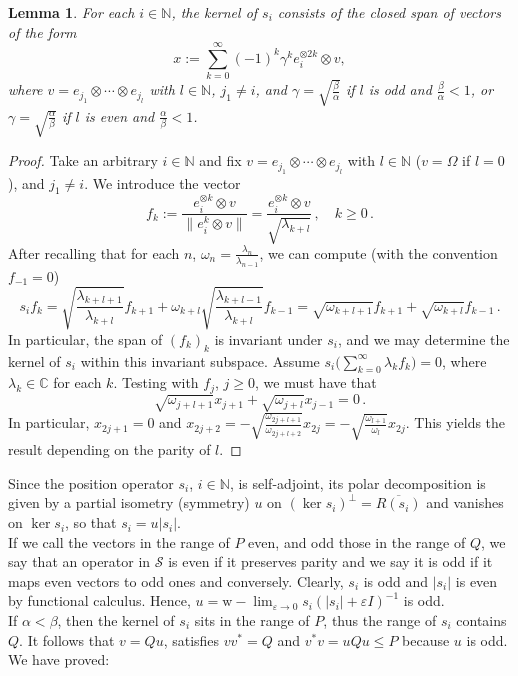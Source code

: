 \documentclass[12pt]{amsart}
\numberwithin{equation}{section}
\def\bc{{\mathbb C}}
\def\bn{{\mathbb N}}
\def\a{\alpha}
\def\b{\beta}
\def\g{\gamma}  \def\G{\Gamma}
\def\eps{\varepsilon}
\def\l{\lambda} \def\L{\Lambda}
\newtheorem{lem}[thm]{Lemma}
\theoremstyle{definition}
\begin{document}
\begin{lem}\label{kernel}
For each $i\in\bn$, the kernel of $s_i$ consists of the closed span of vectors of the form
\begin{equation*}%
x:=\sum_{k=0}^\infty {(-1)^k}{\g^{k}}e_i^{\otimes 2k}\otimes v,
\end{equation*}
where $v=e_{j_1}\otimes \cdots \otimes e_{j_l}$ with $l\in\bn$, $j_1\neq i$, and
$\g=\sqrt{\frac \b \a}$ if $l$ is odd and $\frac \b \a<1$, or $\g=\sqrt{\frac \a \b}$ if $l$ is even and $\frac \a \b<1$.
\end{lem}
\begin{proof}
Take an arbitrary $i\in\bn$ and fix
  $v=e_{j_1} \otimes \cdots \otimes e_{j_l}$ with
  $l\in\bn$ ($v=\Omega$ if $l=0$), and $j_1\neq i$. We introduce the vector
$$
f_k:=\frac{e_i^{\otimes k}\otimes v} {\| e_i^{k}\otimes v\|}= \frac{e_i^{\otimes k}\otimes
  v}{\sqrt{\lambda_{k+l}}}\,, \quad k\geq 0\,.
$$
After recalling that  for each $n$, $\omega_n= \frac {\lambda_n}{\lambda_{n-1}}$, we can compute (with
  the convention $f_{-1}=0$)
$$
s_if_k= \sqrt{\frac{\lambda_{k+l+1}}{\lambda_{k+l}}}f_{k+1}+
  \omega_{k+l} \sqrt{\frac{\lambda_{k+l-1}}{\lambda_{k+l}}}f_{k-1}=
  \sqrt{\omega_{k+l+1}} f_{k+1}+ \sqrt{\omega_{k+l}}f_{k-1}\,.
$$
In particular, the span of $(f_k)_k$ is invariant under $s_i$, and we may determine the kernel of $s_i$ within this invariant subspace. Assume $s_i\big(\sum_{k=0}^\infty \l_k f_k\big)=0$, where $\l_k\in\bc$ for each $k$. Testing with $f_j$, $j\geq 0$, we must have that
$$
\sqrt{\omega_{j+l+1}} x_{j+1}+ \sqrt{\omega_{j+l}}x_{j-1}=0\,.
$$
In particular, $x_{2j+1}=0$ and
  $x_{2j+2}=
 - \sqrt{\frac{\omega_{2j+l+1}}{\omega_{2j+l+2}}}x_{2j}=-\sqrt{\frac{\omega_{l+1}}{\omega_{l}}}
  x_{2j}$.  This yields the result depending on the parity of $l$.
\end{proof}
Since the position operator $s_i$, $i\in\bn$, is self-adjoint, its polar decomposition is given by a partial isometry (symmetry) $u$ on $(\ker s_i)^{\perp}=\overline{R(s_i)}$ and vanishes on $\ker s_i$, so that $s_i=u|s_i|$. \\
If we call the vectors in the range of $P$ even, and odd those in the range of $Q$, we say that an operator in $\mathcal S$ is even if it preserves parity and we say it is odd if it maps even vectors to odd ones and conversely. Clearly, $s_i$ is odd and $|s_i|$ is even by functional calculus. Hence,
$u=\mathrm{w}\!-\!\lim_{\eps\rightarrow 0} s_i(|s_i|+\eps I)^{-1}$ is odd.\\
If $\a<\b$, then the kernel of $s_i$ sits in the range of $P$, thus the range of $s_i$ contains $Q$. It follows that $v=Qu$, satisfies $vv^*=Q$ and $v^*v=uQu\leq  P$ because $u$ is odd. We have proved:
\end{document}
